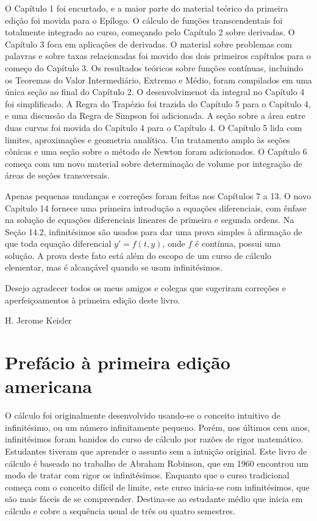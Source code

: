\documentclass{svmono}
\begin{document}
O Capítulo 1 foi encurtado, e a maior parte do material teórico da
primeira edição foi movida para o Epílogo. O cálculo de funções
transcendentais foi totalmente integrado ao curso, começando pelo
Capítulo 2 sobre derivadas. O Capítulo 3 foca em aplicações de
derivadas. O material sobre problemas com palavras e sobre taxas
relacionadas foi movido dos dois primeiros capítulos para o começo
do Capítulo 3. Os resultados teóricos sobre funções contínuas,
incluindo os Teoremas do Valor Intermediário, Extremo e Médio,
foram compilados em uma única seção ao final do Capítulo 2. O
desenvolvimenot da integral no Capítulo 4 foi simplificado. A 
Regra do Trapézio foi trazida do Capítulo 5 para o Capítulo 4, e
uma discussão da Regra de Simpson foi adicionada. A seção sobre a
área entre duas curvas foi movida do Capítulo 4 para o Capítulo 4.
O Capítulo 5 lida com limites, aproximações e geometria analítica.
Um tratamento amplo às seções cônicas e uma seção sobre o método de
Newton foram adicionados. O Capítulo 6 começa com um novo material
sobre determinação de volume por integração de áreas de seções
transversais.

Apenas pequenas mudanças e correções foram feitas nos Capítulos 7
a 13. O novo Capítulo 14 fornece uma primeira introdução a equações
diferenciais, com ênfase na solução de equações diferenciais lineares
de primeira e segunda ordens. Na Seção 14.2, infinitésimos são usados
para dar uma prova simples à afirmação de que toda equação diferencial
$y' = f(t,y)$, onde $f$ é contínua, possui uma solução. A prova deste
fato está além do escopo de um curso de cálculo elementar, mas é alcançável
quando se usam infinitésimos.

Desejo agradecer todos os meus amigos e colegas que sugeriram correções
e aperfeiçoamentos à primeira edição deste livro. 

\hfill H. Jerome Keisler

\chapter*{Prefácio à primeira edição americana}

O cálculo foi originalmente desenvolvido usando-se o conceito intuitivo
de infinitésimo, ou um número infinitamente pequeno. Porém, nos últimos
cem anos, infinitésimos foram banidos do curso de cálculo por razões de
rigor matemático. Estudantes tiveram que aprender o assunto sem a
intuição original. Este livro de cálculo é baseado no trabalho de
Abraham Robinson, que em 1960 encontrou um modo de tratar com rigor os
infinitésimos. Enquanto que o curso tradicional começa com o conceito
difícil de limite, este curso inicia-se com infinitésimos, que são mais
fáceis de se compreender. Destina-se ao estudante médio que inicia em
cálculo e cobre a sequência usual de três ou quatro semestres.
\end{document}
